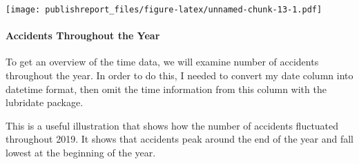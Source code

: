 \documentclass[
]{article}
\begin{document}
\texttt{[image: publishreport\_files/figure-latex/unnamed-chunk-13-1.pdf]}

\hypertarget{accidents-throughout-the-year}{%
\paragraph{Accidents Throughout the
Year}\label{accidents-throughout-the-year}}

To get an overview of the time data, we will examine number of accidents
throughout the year. In order to do this, I needed to convert my date
column into datetime format, then omit the time information from this
column with the lubridate package.

This is a useful illustration that shows how the number of accidents
fluctuated throughout 2019. It shows that accidents peak around the end
of the year and fall lowest at the beginning of the year.
\end{document}
